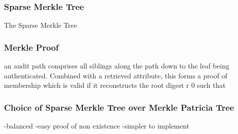 \subsubsection{Sparse Merkle Tree}

The Sparse Merkle Tree

\subsubsection{Merkle Proof}
an audit path comprises all siblings along the path down to the leaf being authenticated. Combined with a retrieved attribute, this forms a proof of membership which is valid if it reconstructs the root digest r 0 such that 

\subsubsection{Choice of Sparse Merkle Tree over Merkle Patricia Tree}

-balanced
-easy proof of non existence
-simpler to implement


